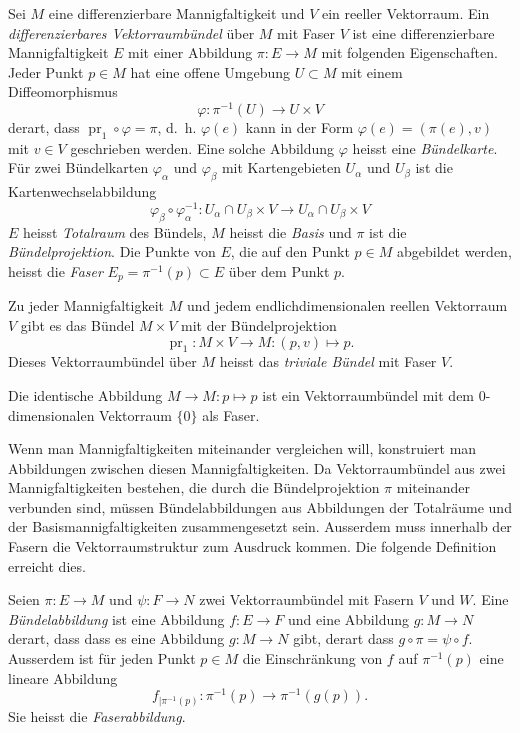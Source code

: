 \begin{definition}[Vektorraumbündel]
Sei $M$ eine differenzierbare Mannigfaltigkeit und $V$ ein reeller
Vektorraum.
Ein \emph{differenzierbares Vektorraumbündel} über $M$ mit Faser $V$
ist eine differenzierbare Mannigfaltigkeit $E$ mit einer Abbildung
$\pi\colon E\to M$ mit folgenden Eigenschaften.
Jeder Punkt $p\in M$ hat eine offene Umgebung $U\subset M$ mit einem
Diffeomorphismus
\[
\varphi\colon \pi^{-1}(U) \to U \times V
\]
derart, dass $\operatorname{pr}_1\circ\varphi =\pi$, d.~h.
$\varphi(e)$ kann in der Form $\varphi(e) = (\pi(e), v)$ mit $v\in V$
geschrieben werden.
Eine solche Abbildung $\varphi$ heisst eine \emph{Bündelkarte}.
Für zwei Bündelkarten $\varphi_\alpha$ und $\varphi_\beta$ mit
Kartengebieten $U_\alpha$ und $U_\beta$ ist die Kartenwechselabbildung
\[
\varphi_\beta
\circ
\varphi_\alpha^{-1}
\colon
U_\alpha\cap U_\beta \times V
\to
U_\alpha\cap U_\beta \times V
\]
$E$ heisst \emph{Totalraum} des Bündels, $M$ heisst die \emph{Basis}
und $\pi$ ist die \emph{Bündelprojektion}.
Die Punkte von $E$, die auf den Punkt $p\in M$ abgebildet werden,
heisst die \emph{Faser} $E_p=\pi^{-1}(p)\subset E$ über dem Punkt $p$.
\end{definition}

\begin{beispiel}
Zu jeder Mannigfaltigkeit $M$ und jedem endlichdimensionalen
reellen Vektorraum $V$ gibt es das Bündel $M\times V$ mit
der Bündelprojektion
\[
\operatorname{pr}_1
\colon
M\times V \to M
:
(p,v) \mapsto p.
\]
Dieses Vektorraumbündel über $M$ heisst das \emph{triviale Bündel}
mit Faser $V$.
\end{beispiel}

\begin{beispiel}
\label{buch:zusammenhang:kovabl:beispiel:0d}
Die identische Abbildung $M\to M:p\mapsto p$ ist ein Vektorraumbündel
mit dem 0-dimensionalen Vektorraum $\{0\}$ als Faser.
\end{beispiel}

Wenn man Mannigfaltigkeiten miteinander vergleichen will, konstruiert
man Abbildungen zwischen diesen Mannigfaltigkeiten.
Da Vektorraumbündel aus zwei Mannigfaltigkeiten bestehen, die durch
die Bündelprojektion $\pi$ miteinander verbunden sind, müssen
Bündelabbildungen aus Abbildungen der Totalräume und der
Basismannigfaltigkeiten zusammengesetzt sein.
Ausserdem muss innerhalb der Fasern die Vektorraumstruktur zum
Ausdruck kommen.
Die folgende Definition erreicht dies.

\begin{definition}[Bündelabbildung]
Seien $\pi\colon E \to M$ und $\psi\colon F\to N$ zwei Vektorraumbündel
mit Fasern $V$ und $W$.
Eine \emph{Bündelabbildung} ist eine Abbildung $f\colon E\to F$ und
eine Abbildung $g\colon M\to N$ derart, dass
dass es eine Abbildung $g\colon M\to N$ gibt, derart dass 
$g\circ\pi=\psi\circ f$.
Ausserdem ist für jeden Punkt $p\in M$ die Einschränkung von $f$ auf
$\pi^{-1}(p)$ eine lineare Abbildung
\[
f_{|\pi^{-1}(p)}
\colon
\pi^{-1}(p)
\to
\pi^{-1}(g(p)).
\]
Sie heisst die \emph{Faserabbildung}.
\end{definition}

